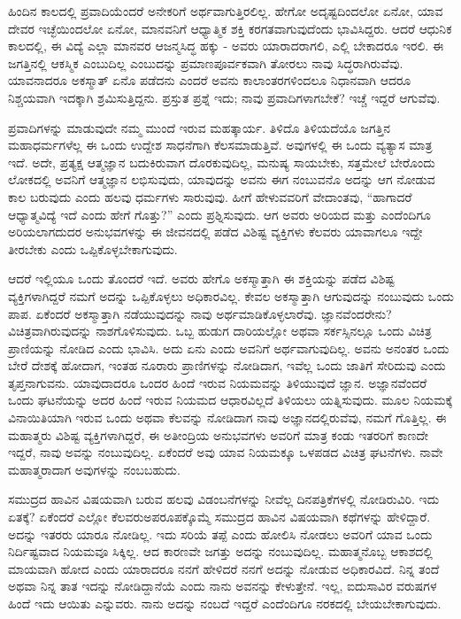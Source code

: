 ಹಿಂದಿನ ಕಾಲದಲ್ಲಿ ಪ್ರವಾದಿಯೆಂದರೆ ಅನೇಕರಿಗೆ ಅರ್ಥವಾಗುತ್ತಿರಲಿಲ್ಲ. ಹೇಗೋ ಅದೃಷ್ಟದಿಂದಲೋ ಏನೋ, ಯಾವ ದೇವರ ಇಚ್ಛೆಯಿಂದಲೋ ಏನೋ, ಮಾನವನಿಗೆ ಆಧ್ಯಾತ್ಮಿಕ ಶಕ್ತಿ ಕರಗತವಾಗುವುದೆಂದು ಭಾವಿಸಿದ್ದರು. ಆದರೆ ಆಧುನಿಕ ಕಾಲದಲ್ಲಿ, ಈ ವಿದ್ಯೆ ಎಲ್ಲಾ ಮಾನವರ ಆಜನ್ಮಸಿದ್ಧ ಹಕ್ಕು - ಅವರು ಯಾರಾದರಾಗಲಿ, ಎಲ್ಲಿ ಬೇಕಾದರೂ ಇರಲಿ. ಈ ಜಗತ್ತಿನಲ್ಲಿ ಆಕಸ್ಮಿಕ ಎಂಬುದಿಲ್ಲ ಎಂಬುದನ್ನು ಪ್ರಮಾಣಪೂರ್ವಕವಾಗಿ ತೋರಲು ನಾವು ಸಿದ್ಧರಾಗಿರುವೆವು. ಯಾವನಾದರೂ ಅಕಸ್ಮಾತ್ ಏನೊ ಪಡೆದನು ಎಂದರೆ ಅವನು ಕಾಲಾಂತರಗಳಿಂದಲೂ ನಿಧಾನವಾಗಿ ಆದರೂ ನಿಶ್ಚಯವಾಗಿ ಇದಕ್ಕಾಗಿ ಶ್ರಮಿಸುತ್ತಿದ್ದನು. ಪ್ರಸ್ತುತ ಪ್ರಶ್ನೆ ಇದು; ನಾವು ಪ್ರವಾದಿಗಳಾಗಬೇಕೆ? ಇಚ್ಚೆ ಇದ್ದರೆ ಆಗುವೆವು.

ಪ್ರವಾದಿಗಳನ್ನು ಮಾಡುವುದೇ ನಮ್ಮ ಮುಂದೆ ಇರುವ ಮಹತ್ಕಾರ್ಯ. ತಿಳಿದೊ ತಿಳಿಯದೆಯೊ ಜಗತ್ತಿನ ಮಹಾಧರ್ಮಗಳೆಲ್ಲ ಈ ಒಂದು ಉದ್ದೇಶ ಸಾಧನೆಗಾಗಿ ಕೆಲಸಮಾಡುತ್ತಿವೆ. ಅವುಗಳಲ್ಲಿ ಈ ಒಂದು ವ್ಯತ್ಯಾಸ ಮಾತ್ರ ಇದೆ. ಅದೇ, ಪ್ರತ್ಯಕ್ಷ ಆತ್ಮಜ್ಞಾನ ಬದುಕಿರುವಾಗ ದೊರಕುವುದಿಲ್ಲ, ಮನುಷ್ಯ ಸಾಯಬೇಕು, ಸತ್ತಮೇಲೆ ಬೇರೊಂದು ಲೋಕದಲ್ಲಿ ಅವನಿಗೆ ಆತ್ಮಜ್ಞಾನ ಲಭಿಸುವುದು, ಯಾವುದನ್ನು ಅವನು ಈಗ ನಂಬುವನೊ ಅದನ್ನು ಆಗ ನೋಡುವ ಕಾಲ ಬರುವುದು ಎಂದು ಹಲವು ಧರ್ಮಗಳು ಸಾರುವುವು. ಹೀಗೆ ಹೇಳುವವರಿಗೆ ವೇದಾಂತವು, “ಹಾಗಾದರೆ ಆಧ್ಯಾತ್ಮವಿದ್ಯೆ ಇದೆ ಎಂದು ಹೇಗೆ ಗೊತ್ತು?'' ಎಂದು ಪ್ರಶ್ನಿಸುವುದು. ಆಗ ಅವರು ಅರಿಯದ ಮತ್ತು ಎಂದೆಂದಿಗೂ ಅರಿಯಲಾಗದುದರ ಅನುಭವಗಳನ್ನು ಈ ಜೀವನದಲ್ಲಿ ಪಡೆದ ವಿಶಿಷ್ಟ ವ್ಯಕ್ತಿಗಳು ಕೆಲವರು ಯಾವಾಗಲೂ ಇದ್ದೇ ತೀರಬೇಕು ಎಂದು ಒಪ್ಪಿಕೊಳ್ಳಬೇಕಾಗುವುದು.

ಆದರೆ ಇಲ್ಲಿಯೂ ಒಂದು ತೊಂದರೆ ಇದೆ. ಅವರು ಹೇಗೊ ಅಕಸ್ಮಾತ್ತಾಗಿ ಈ ಶಕ್ತಿಯನ್ನು ಪಡೆದ ವಿಶಿಷ್ಟ ವ್ಯಕ್ತಿಗಳಾಗಿದ್ದರೆ ನಮಗೆ ಅದನ್ನು ಒಪ್ಪಿಕೊಳ್ಳಲು ಅಧಿಕಾರವಿಲ್ಲ. ಕೇವಲ ಅಕಸ್ಮಾತ್ತಾಗಿ ಆಗುವುದನ್ನು ನಂಬುವುದು ಒಂದು ಪಾಪ. ಏಕೆಂದರೆ ಅಕಸ್ಮಾತ್ತಾಗಿ ನಡೆಯುವುದನ್ನು ನಾವು ಅರ್ಥಮಾಡಿಕೊಳ್ಳಲಾರೆವು. ಜ್ಞಾನವೆಂದರೇನು? ವಿಚಿತ್ರವಾಗಿರುವುದನ್ನು ನಾಶಗೊಳಿಸುವುದು. ಒಬ್ಬ ಹುಡುಗ ದಾರಿಯಲ್ಲೋ ಅಥವಾ ಸರ್ಕಸ್ಸಿನಲ್ಲೂ ಒಂದು ವಿಚಿತ್ರ ಪ್ರಾಣಿಯನ್ನು ನೋಡಿದ ಎಂದು ಭಾವಿಸಿ. ಅದು ಏನು ಎಂದು ಅವನಿಗೆ ಅರ್ಥವಾಗುವುದಿಲ್ಲ. ಅವನು ಅನಂತರ ಒಂದು ಬೇರೆ ದೇಶಕ್ಕೆ ಹೋದಾಗ, ಇಂತಹ ನೂರಾರು ಪ್ರಾಣಿಗಳನ್ನು ನೋಡಿದಾಗ, ಇವೆಲ್ಲ ಒಂದು ಜಾತಿಗೆ ಸೇರಿದುವು ಎಂದು ತೃಪ್ತನಾಗುವನು. ಯಾವುದಾದರೂ ಒಂದರ ಹಿಂದೆ ಇರುವ ನಿಯಮವನ್ನು ತಿಳಿಯುವುದೆ ಜ್ಞಾನ. ಅಜ್ಞಾನವೆಂದರೆ ಒಂದು ಘಟನೆಯನ್ನು ಅದರ ಹಿಂದೆ ಇರುವ ನಿಯಮದ ಆಧಾರವಿಲ್ಲದೆ ತಿಳಿಯಲು ಯತ್ನಿಸುವುದು. ಮೂಲ ನಿಯಮಕ್ಕೆ ವಿನಾಯಿತಿಯಾಗಿ ಇರುವ ಒಂದು ಅಥವಾ ಕೆಲವನ್ನು ನೋಡಿದಾಗ ನಾವು ಅಜ್ಞಾನದಲ್ಲಿರುವೆವು, ನಮಗೆ ಗೊತ್ತಿಲ್ಲ. ಈ ಮಹಾತ್ಮರು ವಿಶಿಷ್ಟ ವ್ಯಕ್ತಿಗಳಾಗಿದ್ದರೆ, ಈ ಅತೀಂದ್ರಿಯ ಅನುಭವಗಳು ಅವರಿಗೆ ಮಾತ್ರ ಕಂಡು ಇತರರಿಗೆ ಕಾಣದೇ ಇದ್ದರೆ, ನಾವು ಅವನ್ನು ನಂಬುವುದಿಲ್ಲ. ಏಕೆಂದರೆ ಅವು ಯಾವ ನಿಯಮಕ್ಕೂ ಒಳಪಡದ ವಿಚಿತ್ರ ಘಟನೆಗಳು. ನಾವೇ ಮಹಾತ್ಮರಾದಾಗ ಅವುಗಳನ್ನು ನಂಬಬಹುದು.

ಸಮುದ್ರದ ಹಾವಿನ ವಿಷಯವಾಗಿ ಬರುವ ಹಲವು ವಿಡಂಬನೆಗಳನ್ನು ನೀವೆಲ್ಲ ದಿನಪತ್ರಿಕೆಗಳಲ್ಲಿ ನೋಡಿರುವಿರಿ. ಇದು ಏತಕ್ಕೆ? ಏಕೆಂದರೆ ಎಲ್ಲೋ ಕೆಲವರು\break ಅಪರೂಪಕ್ಕೊಮ್ಮೆ ಸಮುದ್ರದ ಹಾವಿನ ವಿಷಯವಾಗಿ ಕಥೆಗಳನ್ನು ಹೇಳಿದ್ದಾರೆ. ಅದನ್ನು ಇತರರು ಯಾರೂ ನೋಡಿಲ್ಲ. ಇದು ಸರಿಯೆ ತಪ್ಪೆ ಎಂದು ಹೋಲಿಸಿ ನೋಡಲು ಅವರಿಗೆ ಯಾವ ಒಂದು ನಿರ್ದಿಷ್ಟವಾದ ನಿಯಮವೂ ಸಿಕ್ಕಿಲ್ಲ. ಆದ ಕಾರಣವೇ ಜಗತ್ತು ಅದನ್ನು ನಂಬುವುದಿಲ್ಲ. ಮಹಾತ್ಮನೊಬ್ಬ ಆಕಾಶದಲ್ಲಿ ಮಾಯವಾಗಿ ಹೋದ ಎಂದು ಯಾರಾದರೂ ನನಗೆ ಹೇಳಿದರೆ ನನಗೆ ಅದನ್ನು ನೋಡುವ ಅಧಿಕಾರವಿದೆ. ನಿನ್ನ ತಂದೆ ಅಥವಾ ನಿನ್ನ ತಾತ ಇದನ್ನು ನೋಡಿದ್ದಾನೆಯೆ ಎಂದು ನಾನು ಅವನನ್ನು ಕೇಳುತ್ತೇನೆ. ಇಲ್ಲ, ಐದುಸಾವಿರ ವರುಷಗಳ ಹಿಂದೆ ಇದು ಆಯಿತು ಎನ್ನುವರು. ನಾನು ಅದನ್ನು ನಂಬದೆ ಇದ್ದರೆ ಎಂದೆಂದಿಗೂ ನರಕದಲ್ಲಿ ಬೇಯಬೇಕಾಗುವುದು.

